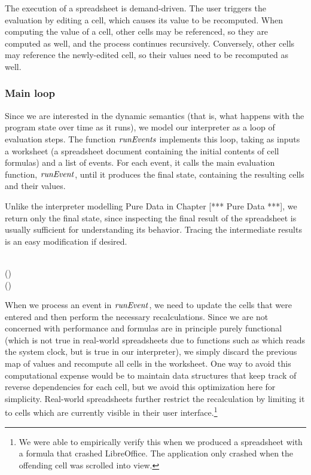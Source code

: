 The execution of a spreadsheet is demand-driven. The user triggers the
evaluation by editing a cell, which causes its value to be recomputed. When
computing the value of a cell, other cells may be referenced, so they are
computed as well, and the process continues recursively. Conversely,
other cells may reference the newly-edited cell, so their values need
to be recomputed as well.

\subsubsection{Main loop}

Since we are interested in the dynamic semantics (that is, what happens with
the program state over time as it runs), we model our interpreter as a loop of
evaluation steps. The function \ensuremath{\Varid{runEvents}} implements this loop, taking as
inputs a worksheet (a spreadsheet document containing the initial contents of
cell formulas) and a list of events. For each event, it calls the main
evaluation function, \ensuremath{\Varid{runEvent}}, until it produces the final state, containing
the resulting cells and their values.

Unlike the interpreter modelling Pure Data in Chapter [*** Pure Data ***], we
return only the final state, since inspecting the final result of the
spreadsheet is usually sufficient for understanding its behavior. Tracing the
intermediate results is an easy modification if desired.

\begin{hscode}\SaveRestoreHook
{}%
%
%
\>[B]{}\mathbin{::}\to {}\<[E]%
\\
\>[B]{}\;(\;)\;\mathrel{=}{}\<[E]%
\\
\>[B]{}\<[4]%
\>[4]{}\;\;(\;\;)\;\<[E]%
\ColumnHook
\end{hscode}\resethooks

When we process an event in \ensuremath{\Varid{runEvent}}, we need to update the cells that were
entered and then perform the necessary recalculations. Since we are not
concerned with performance and formulas are in principle purely functional
(which is not true in real-world spreadsheets due to functions such as 
which reads the system clock, but is true in our interpreter), we simply
discard the previous map of values and recompute all cells in the worksheet.
One way to avoid this computational expense would be to maintain data
structures that keep track of reverse dependencies for each cell, but we avoid
this optimization here for simplicity. Real-world spreadsheets further
restrict the recalculation by limiting it to cells which are currently visible
in their user interface.\footnote{We were able to empirically verify this when
we produced a spreadsheet with a formula that crashed LibreOffice. The
application only crashed when the offending cell was scrolled into view.}

